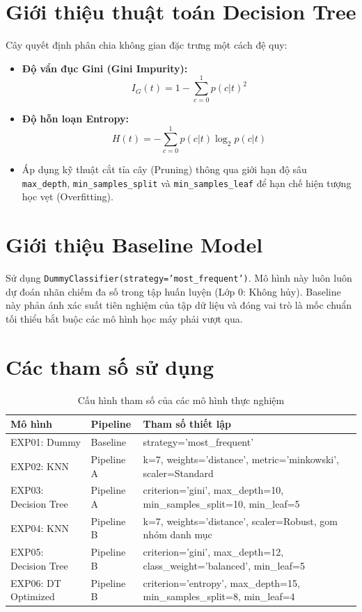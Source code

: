 \section{Giới thiệu thuật toán Decision Tree}
Cây quyết định phân chia không gian đặc trưng một cách đệ quy:
\begin{itemize}
    \item \textbf{Độ vẩn đục Gini (Gini Impurity):}
    \begin{equation}
        I_G(t) = 1 - \sum_{c=0}^1 p(c|t)^2
    \end{equation}
    \item \textbf{Độ hỗn loạn Entropy:}
    \begin{equation}
        H(t) = -\sum_{c=0}^1 p(c|t) \log_2 p(c|t)
    \end{equation}
    \item Áp dụng kỹ thuật cắt tỉa cây (Pruning) thông qua giới hạn độ sâu \texttt{max\_depth}, \texttt{min\_samples_split} và \texttt{min\_samples_leaf} để hạn chế hiện tượng học vẹt (Overfitting).
\end{itemize}

\section{Giới thiệu Baseline Model}
Sử dụng \texttt{DummyClassifier(strategy='most_frequent')}. Mô hình này luôn luôn dự đoán nhãn chiếm đa số trong tập huấn luyện (Lớp 0: Không hủy). Baseline này phản ánh xác suất tiên nghiệm của tập dữ liệu và đóng vai trò là mốc chuẩn tối thiểu bắt buộc các mô hình học máy phải vượt qua.

\section{Các tham số sử dụng}
\begin{table}[H]
    \centering
    \caption{Cấu hình tham số của các mô hình thực nghiệm}
    \label{tab:model_params}
    \begin{tabular}{lll}
        \toprule
        \textbf{Mô hình} & \textbf{Pipeline} & \textbf{Tham số thiết lập} \\
        \midrule
        EXP01: Dummy & Baseline & strategy='most\_frequent' \\
        EXP02: KNN & Pipeline A & k=7, weights='distance', metric='minkowski', scaler=Standard \\
        EXP03: Decision Tree & Pipeline A & criterion='gini', max\_depth=10, min\_samples\_split=10, min\_leaf=5 \\
        EXP04: KNN & Pipeline B & k=7, weights='distance', scaler=Robust, gom nhóm danh mục \\
        EXP05: Decision Tree & Pipeline B & criterion='gini', max\_depth=12, class\_weight='balanced', min\_leaf=5 \\
        EXP06: DT Optimized & Pipeline B & criterion='entropy', max\_depth=15, min\_samples\_split=8, min\_leaf=4 \\
        \bottomrule
    \end{tabular}
\end{table}
